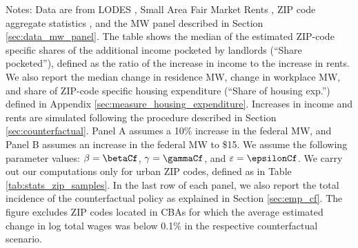 \begin{table}[hbt!]
    \begin{minipage}{.95\textwidth} \footnotesize
        \vspace{2mm}
        Notes: 
        Data are from LODES \parencite{CensusLODES}, 
        Small Area Fair Market Rents \parencite{hudSAFMR},
        ZIP code aggregate statistics \parencite{IRS}, and
        the MW panel described in Section \ref{sec:data_mw_panel}.
        The table shows the median of the estimated ZIP-code specific shares of 
        the additional income pocketed by landlords (``Share pocketed''), 
        defined as the ratio of the increase in income to the increase in rents. 
        We also report the median change in residence MW, change in workplace MW,
        and share of ZIP-code specific housing expenditure 
        (``Share of housing exp.'') defined in Appendix 
        \ref{sec:measure_housing_expenditure}.
        Increases in income and rents are simulated following the procedure 
        described in Section \ref{sec:counterfactual}.
        Panel A assumes a 10\% increase in the federal MW, and
        Panel B assumes an increase in the federal MW to \$15.
        We assume the following parameter values:
        $\beta = \betaCf$, $\gamma = \gammaCf$, and $\varepsilon = \epsilonCf$.
        We carry out our computations only for urban ZIP codes, defined as 
        in Table \ref{tab:stats_zip_samples}.
        In the last row of each panel, we also report the total incidence of the 
        counterfactual policy as explained in Section \ref{sec:emp_cf}.
        The figure excludes ZIP codes located in CBAs for which the average
        estimated change in log total wages was below 0.1\% in the respective
        counterfactual scenario.
    \end{minipage}
\end{table}
